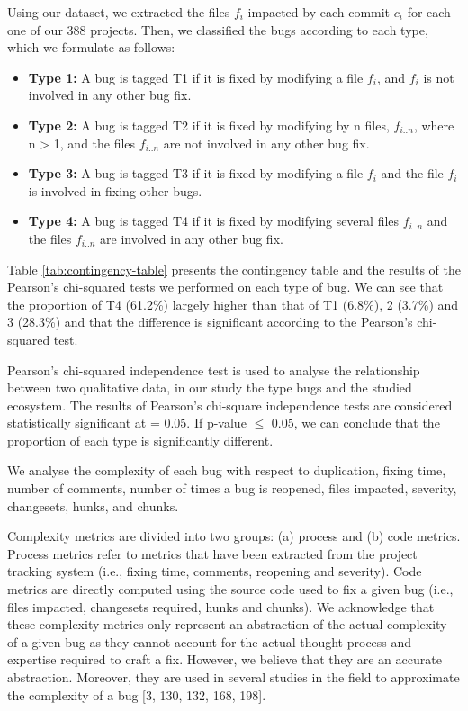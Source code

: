 \documentclass[12pt]{report}
\providecommand{\tightlist}{%
  \setlength{\itemsep}{0pt}\setlength{\parskip}{0pt}}
\begin{document}
Using our dataset, we extracted the files \(f_i\) impacted by each
commit \(c_i\) for each one of our 388 projects. Then, we classified the
bugs according to each type, which we formulate as follows:

\begin{itemize}
\tightlist
\item
  \textbf{Type 1:} A bug is tagged T1 if it is fixed by modifying a file
  \(f_i\), and \(f_i\) is not involved in any other bug fix.
\item
  \textbf{Type 2:} A bug is tagged T2 if it is fixed by modifying by n
  files, \(f_{i..n}\), where n \textgreater{} 1, and the files
  \(f_{i..n}\) are not involved in any other bug fix.
\item
  \textbf{Type 3:} A bug is tagged T3 if it is fixed by modifying a file
  \(f_{i}\) and the file \(f_{i}\) is involved in fixing other bugs.
\item
  \textbf{Type 4:} A bug is tagged T4 if it is fixed by modifying
  several files \(f_{i..n}\) and the files \(f_{i..n}\) are involved in
  any other bug fix.
\end{itemize}



Table \ref{tab:contingency-table} presents the contingency table and the
results of the Pearson's chi-squared tests we performed on each type of
bug. We can see that the proportion of T4 (61.2\%) largely higher than
that of T1 (6.8\%), 2 (3.7\%) and 3 (28.3\%) and that the difference is
significant according to the Pearson's chi-squared test.

Pearson's chi-squared independence test is used to analyse the
relationship between two qualitative data, in our study the type bugs
and the studied ecosystem. The results of Pearson's chi-square
independence tests are considered statistically significant at = 0.05.
If p-value \(\leq\) 0.05, we can conclude that the proportion of each
type is significantly different.

We analyse the complexity of each bug with respect to duplication, fixing
time, number of comments, number of times a bug is reopened, files
impacted, severity, changesets, hunks, and chunks.

Complexity metrics are divided into two groups: (a) process and (b) code
metrics. Process metrics refer to metrics that have been extracted from
the project tracking system (i.e., fixing time, comments, reopening and
severity). Code metrics are directly computed using the source code used
to fix a given bug (i.e., files impacted, changesets required, hunks and
chunks). We acknowledge that these complexity metrics only represent an
abstraction of the actual complexity of a given bug as they cannot
account for the actual thought process and expertise required to craft a
fix. However, we believe that they are an accurate abstraction.
Moreover, they are used in several studies in the field to approximate
the complexity of a bug {[}3, 130, 132, 168, 198{]}.
\end{document}
